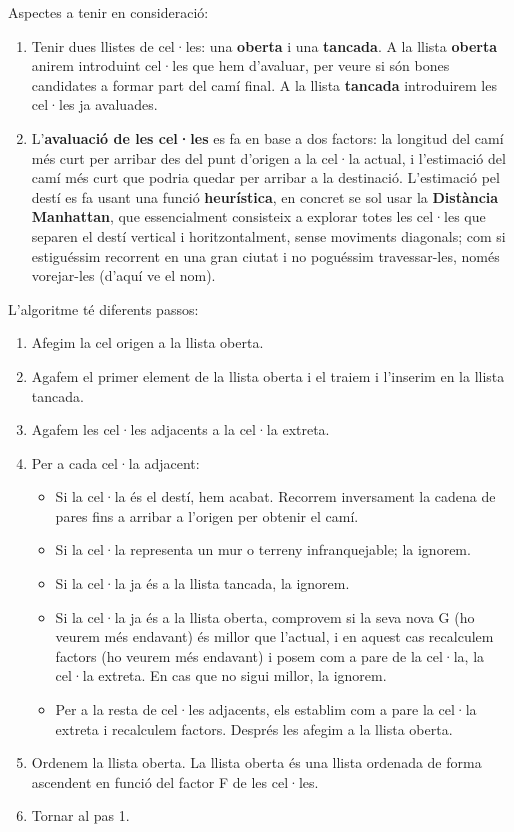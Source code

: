 \documentclass[12pt]{article}
\begin{document}
Aspectes a tenir en consideració:

\begin{enumerate}
	\item Tenir dues llistes de cel·les: una \textbf{oberta} i una \textbf{tancada}. A la llista \textbf{oberta} anirem introduint cel·les que hem d'avaluar, per veure si són bones candidates a formar part del camí final. A la llista \textbf{tancada} introduirem les cel·les ja avaluades.

	\item L'\textbf{avaluació de les cel·les} es fa en base a dos factors: la longitud del camí més curt per arribar des del punt d'origen a la cel·la actual, i l'estimació del camí més curt que podria quedar per arribar a la destinació. L'estimació pel destí es fa usant una funció \textbf{heurística}, en concret se sol usar la \textbf{Distància Manhattan}, que essencialment consisteix a explorar totes les cel·les que separen el destí vertical i horitzontalment, sense moviments diagonals; com si estiguéssim recorrent  en una gran ciutat i no poguéssim travessar-les, només vorejar-les (d'aquí ve el nom).
\end{enumerate}

L'algoritme té diferents passos:

\begin{enumerate}
	\item Afegim la cel origen a la llista oberta.
	\item Agafem el primer element de la llista oberta i el traiem i l'inserim en la llista tancada.
	\item Agafem les cel·les adjacents a la cel·la extreta.
	\item Per a cada cel·la adjacent:
	\begin{itemize}
		\item Si la cel·la és el destí, hem acabat. Recorrem inversament la cadena de pares fins a arribar a l'origen per obtenir el camí.
		\item Si la cel·la representa un mur o terreny infranquejable; la ignorem.
		\item Si la cel·la ja és a la llista tancada, la ignorem.
		\item Si la cel·la ja és a la llista oberta, comprovem si la seva nova G (ho veurem més endavant) és millor que l'actual, i en aquest cas recalculem factors (ho veurem més endavant) i posem com a pare de la cel·la, la cel·la extreta. En cas que no sigui millor, la ignorem.
		\item Per a la resta de cel·les adjacents, els establim com a pare la cel·la extreta i recalculem factors. Després les afegim a la llista oberta.
	\end{itemize}
	\item Ordenem la llista oberta. La llista oberta és una llista ordenada de forma ascendent en funció del factor F de les cel·les.
	\item Tornar al pas 1.
\end{enumerate}
\end{document}
